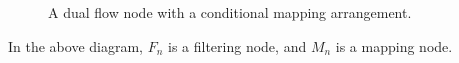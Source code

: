 \begin{figure}[h]
\centering
{}
\caption{A dual flow node with a conditional mapping arrangement.}
\end{figure}

\par In the above diagram, $F_n$ is a filtering node, and $M_n$ is a mapping node.
